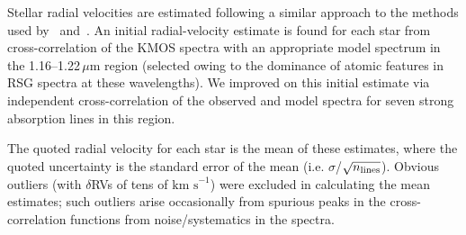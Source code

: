 \documentclass[useAMS,usenatbib]{mn2e}
\def\kms{$\mbox{km s}^{-1}$}
\begin{document}

Stellar radial velocities are estimated following a similar approach to the methods used by~\citet{2015ApJ...798...23L} and~\citet{2015ApJ...803...14P}. An initial radial-velocity estimate is found for each star from cross-correlation of the KMOS spectra with an appropriate model spectrum in the 1.16--1.22\,$\mu$m region
(selected owing to the dominance of atomic features in RSG spectra at these wavelengths).
We improved on this initial estimate via independent cross-correlation of the observed and model spectra for seven strong absorption lines in this region.

The quoted radial velocity for each star is the mean of these estimates, where the quoted uncertainty is the standard error of the mean
(i.e. $\sigma$/$\sqrt{n_{\rm lines}}$).
Obvious outliers (with $\delta$RVs of tens of \kms) were excluded in calculating the mean estimates; such outliers arise occasionally from spurious peaks in the cross-correlation functions from noise/systematics in the spectra.



\end{document}
